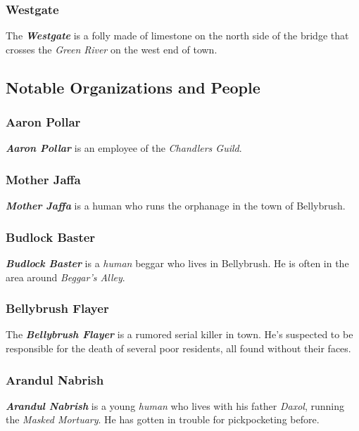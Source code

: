 \documentclass[11pt]{teraum_adventure}
\begin{document}
\subsubsection*{Westgate}
\label{sec:org00a1ca7}
The \textbf{\emph{Westgate}} is a folly made of limestone on the north side of the
bridge that crosses the \emph{Green River} on the west end of town.
\subsection*{Notable Organizations and People}
\label{sec:org2eb73f2}
\subsubsection*{Aaron Pollar}
\label{sec:orge0786c1}
\textbf{\emph{Aaron Pollar}} is an employee of the \emph{Chandlers Guild}.
\subsubsection*{Mother Jaffa}
\label{sec:orgc12ca97}
\textbf{\emph{Mother Jaffa}} is a human who runs the orphanage in the town of
Bellybrush.
\subsubsection*{Budlock Baster}
\label{sec:org5324db1}
\textbf{\emph{Budlock Baster}} is a \emph{human} beggar who lives in Bellybrush. He is often in
the area around \emph{Beggar's Alley}.
\subsubsection*{Bellybrush Flayer}
\label{sec:org1b8a312}
The \textbf{\emph{Bellybrush Flayer}} is a rumored serial killer in town. He's
suspected to be responsible for the death of several poor residents,
all found without their faces.
\subsubsection*{Arandul Nabrish}
\label{sec:orge018cf4}
\textbf{\emph{Arandul Nabrish}} is a young \emph{human} who lives with his father
\emph{Daxol}, running the \emph{Masked Mortuary}. He has gotten in trouble for
pickpocketing before.
\end{document}
